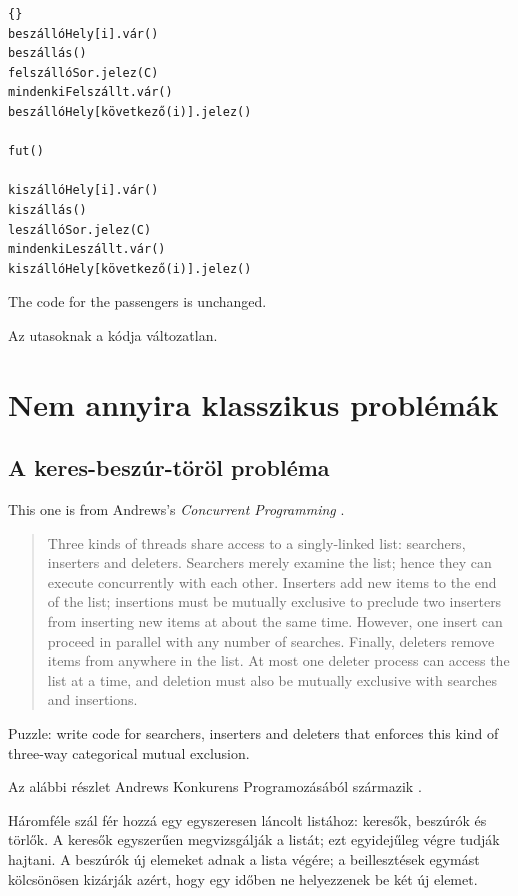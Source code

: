 \documentclass{book}
\newcommand{\clearemptydoublepage}{\newpage\cleardoublepage}
\begin{document}
\begin{lstlisting}[title={Többkocsis hullámvasút megoldás (kocsik)}]{}
beszállóHely[i].vár()
beszállás()
felszállóSor.jelez(C)
mindenkiFelszállt.vár()
beszállóHely[következő(i)].jelez()

fut()

kiszállóHely[i].vár()
kiszállás()
leszállóSor.jelez(C)
mindenkiLeszállt.vár()
kiszállóHely[következő(i)].jelez()
\end{lstlisting}

The code for the passengers is unchanged.

Az utasoknak a kódja változatlan.

\clearemptydoublepage
\chapter{Nem annyira klasszikus problémák}

\section{A keres-beszúr-töröl probléma}

This one is from Andrews's {\em Concurrent Programming} \cite{andrews}.

\begin {quotation}
Three kinds of threads share access to a singly-linked list:
searchers, inserters and deleters.  Searchers merely examine the list;
hence they can execute concurrently with each other.  Inserters add
new items to the end of the list; insertions must be mutually
exclusive to preclude two inserters from inserting new items at about
the same time.  However, one insert can proceed in parallel with any
number of searches.  Finally, deleters remove items from anywhere in
the list.  At most one deleter process can access the list at a time,
and deletion must also be mutually exclusive with searches and
insertions.
\end{quotation}

Puzzle: write code for searchers, inserters and deleters that
enforces this kind of three-way categorical mutual exclusion.

Az alábbi részlet Andrews Konkurens Programozásából származik \cite{andrews}.

Háromféle szál fér hozzá egy egyszeresen láncolt listához:
keresők, beszúrók és törlők. A keresők egyszerűen megvizsgálják
a listát; ezt egyidejűleg végre tudják hajtani. A beszúrók új
elemeket adnak a lista végére; a beillesztések egymást kölcsönösen
kizárják azért, hogy egy időben ne helyezzenek be két új elemet.
\end{document}
